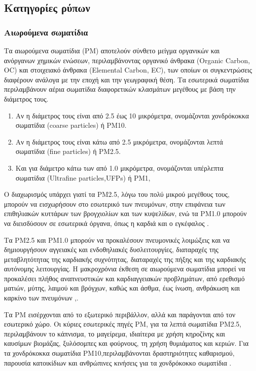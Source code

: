  \subsection  {Κατηγορίες ρύπων}


\subsubsection {Αιωρούμενα σωματίδια}



Τα αιωρούμενα σωματίδια (PM) αποτελούν σύνθετο μείγμα οργανικών και ανόργανων χημικών ενώσεων, περιλαμβάνοντας οργανικό άνθρακα (Organic Carbon, OC) και στοιχειακό άνθρακα (Elemental Carbon, EC),
των οποίων οι συγκεντρώσεις διαφέρουν ανάλογα με την εποχή και την γεωγραφική θέση. 
Τα εσωτερικά σωματίδια περιλαμβάνουν αέρια σωματίδια διαφορετικών κλασμάτων μεγέθους με βάση την διάμετρος τους.
\begin {enumerate}

\item Αν η διάμετρος τους είναι από 2.5 έως 10 μικρόμετρα, ονομάζονται χονδρόκοκκα σωματίδια (coarse particles) ή PM10.
\item Αν η διάμετρος τους είναι κάτω από 2.5 μικρόμετρα, ονομάζονται λεπτά σωματίδια (fine particles) ή PM2.5.
\item Και για διάμετρο κάτω των από 1.0 μικρόμετρα, ονομάζονται υπέρλεπτα σωματίδια (Ultrafine particles,UFPs) ή PM1, 
\end{enumerate}

Ο διαχωρισμός υπάρχει γιατί τα PM2.5, λόγω του πολύ μικρού μεγέθους τους, μπορούν να εισχωρήσουν στο εσωτερικό των πνευμόνων, στην επιφάνεια των επιθηλιακών κυττάρων των βρογχιολίων και των κυψελίδων, ενώ τα PM1.0 μπορούν να διεισδύσουν σε εσωτερικά όργανα, όπως η καρδιά και ο εγκέφαλος \cite{SANGKHAM2024100603}. 

Τα PM2.5 και PM1.0 μπορούν να προκαλέσουν πνευμονικές λοιμώξεις και να δημιουργήσουν αγγειακές και ενδοθηλιακές δυσλειτουργίες, διαταραχές της μεταβλητότητας της καρδιακής συχνότητας, διαταραχές της πήξης και της καρδιακής αυτόνομης λειτουργίας.
Η μακροχρόνια έκθεση σε αιωρούμενα σωματίδια μπορεί να προκαλέσει πλήθος αναπνευστικών και καρδιαγγειακών προβλημάτων, από ερεθισμό ματιών, μύτης, λαιμού και βρόγχων, καθώς και άσθμα, 
έως ίνωση, ανθράκωση και καρκίνο των πνευμόνων \cite{su12219045},\cite{GONZALEZMARTIN2021128376}.

Τα PM εισέρχονται από το εξωτερικό περιβάλλον, αλλά και παράγονται από τον εσωτερικό χώρο. 
Οι κύριες εσωτερικές πηγές PM, για τα λεπτά σωματίδια PM2.5, περιλαμβάνουν το κάπνισμα, το μαγείρεμα, ιδιαίτερα με χρήση κηροζίνης και καυσίμων βιομάζας, ξυλόσομπες και φούρνους, τη χρήση θυμιάματος και κεριών.
Για τα χονδρόκοκκα σωματίδια PM10,περιλαμβάνονται δραστηριότητες καθαρισμού, παρουσία κατοικίδιων και ανθρώπινες κινήσεις για τα χονδρόκοκκο σωματίδια \cite{ijerph17238972}.


